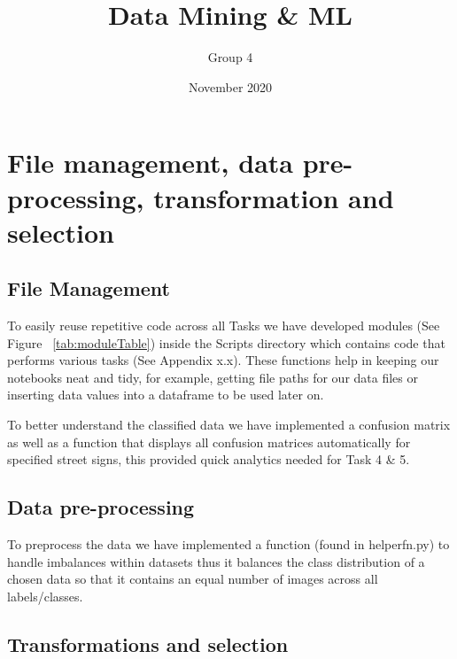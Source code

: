\documentclass[11pt]{article}
\title{Data Mining \& ML}
\author{ Group 4 }
\date{November 2020}
\begin{document}
\maketitle

\pagebreak

\tableofcontents
\thispagestyle{empty}
\pagebreak
\setcounter{page}{1}

\pagebreak

    

\section{File management, data pre-processing, transformation and selection} 
\subsection{File Management}

To easily reuse repetitive code across all Tasks we have developed modules (See Figure ~\ref{tab:moduleTable}) inside 
the Scripts directory which contains code that performs various tasks (See Appendix x.x). These functions help
in keeping our notebooks neat and tidy, for example, getting file paths for our data files or 
inserting data values into a dataframe to be used later on.
\par
To better understand the classified data we have implemented a confusion matrix as well as 
a function that displays all confusion matrices automatically for specified street signs, this 
provided quick analytics needed for Task 4 \& 5.

\subsection{Data pre-processing}

To preprocess the data we have implemented a function (found in helperfn.py) to handle imbalances 
within datasets thus it balances the class distribution of a chosen data so that it contains an 
equal number of images across all labels/classes.

\subsection{Transformations and selection}\label{sec:transSel}
\end{document}

